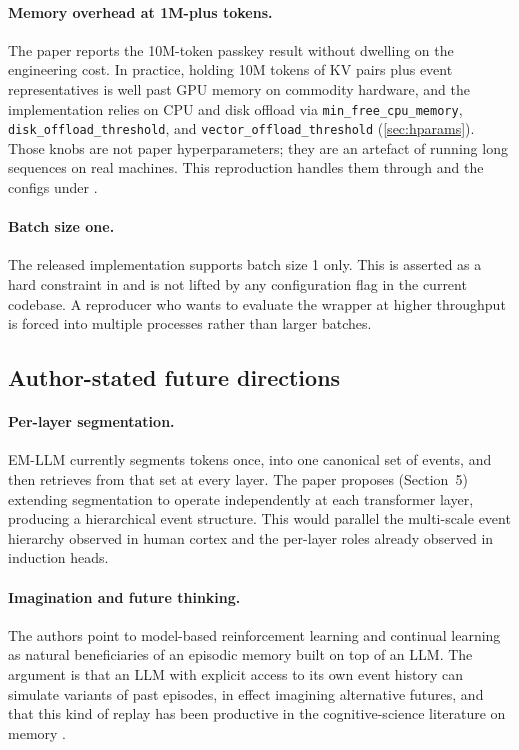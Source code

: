 \paragraph{Memory overhead at 1M-plus tokens.}
The paper reports the 10M-token passkey result without dwelling on the engineering cost. In practice, holding 10M tokens of KV pairs plus event representatives is well past GPU memory on commodity hardware, and the implementation relies on CPU and disk offload via \texttt{min\_free\_cpu\_memory}, \texttt{disk\_offload\_threshold}, and \texttt{vector\_offload\_threshold} (\cref{sec:hparams}). Those knobs are not paper hyperparameters; they are an artefact of running long sequences on real machines. This reproduction handles them through  and the configs under .

\paragraph{Batch size one.}
The released implementation supports batch size 1 only. This is asserted as a hard constraint in  and is not lifted by any configuration flag in the current codebase. A reproducer who wants to evaluate the wrapper at higher throughput is forced into multiple processes rather than larger batches.

\subsection{Author-stated future directions}

\paragraph{Per-layer segmentation.}
EM-LLM currently segments tokens once, into one canonical set of events, and then retrieves from that set at every layer. The paper proposes (Section~5) extending segmentation to operate independently at each transformer layer, producing a hierarchical event structure. This would parallel the multi-scale event hierarchy observed in human cortex \cite{baldassano2017discovering} and the per-layer roles already observed in induction heads.

\paragraph{Imagination and future thinking.}
The authors point to model-based reinforcement learning and continual learning as natural beneficiaries of an episodic memory built on top of an LLM. The argument is that an LLM with explicit access to its own event history can simulate variants of past episodes, in effect imagining alternative futures, and that this kind of replay has been productive in the cognitive-science literature on memory \cite{spens2024construction}.

